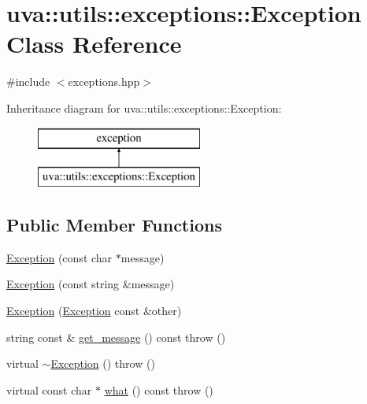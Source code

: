 \hypertarget{classuva_1_1utils_1_1exceptions_1_1_exception}{}\section{uva\+:\+:utils\+:\+:exceptions\+:\+:Exception Class Reference}
\label{classuva_1_1utils_1_1exceptions_1_1_exception}


{\ttfamily \#include $<$exceptions.\+hpp$>$}

Inheritance diagram for uva\+:\+:utils\+:\+:exceptions\+:\+:Exception\+:\begin{figure}[H]
\begin{center}
\leavevmode
\includegraphics[height=2.000000cm]{classuva_1_1utils_1_1exceptions_1_1_exception}
\end{center}
\end{figure}
\subsection*{Public Member Functions}
\begin{DoxyCompactItemize}
\item 
\hyperlink{classuva_1_1utils_1_1exceptions_1_1_exception_a604280ad919b510e4db6d7d01dcc0c5a}{Exception} (const char $\ast$message)
\item 
\hyperlink{classuva_1_1utils_1_1exceptions_1_1_exception_a4600cc90594ab2ecb849faac33ec473b}{Exception} (const string \&message)
\item 
\hyperlink{classuva_1_1utils_1_1exceptions_1_1_exception_a2c1690463975e76222e80cf34b9dca3c}{Exception} (\hyperlink{classuva_1_1utils_1_1exceptions_1_1_exception}{Exception} const \&other)
\item 
string const \& \hyperlink{classuva_1_1utils_1_1exceptions_1_1_exception_a0008575ceece1a6530510f50e44e5457}{get\+\_\+message} () const   throw ()
\item 
virtual \hyperlink{classuva_1_1utils_1_1exceptions_1_1_exception_adb3ed0c902ec0851dd27942a61fe7ee4}{$\sim$\+Exception} ()  throw ()
\item 
virtual const char $\ast$ \hyperlink{classuva_1_1utils_1_1exceptions_1_1_exception_a46e76809444e422626ab7cb2995dc535}{what} () const   throw ()
\end{DoxyCompactItemize}


